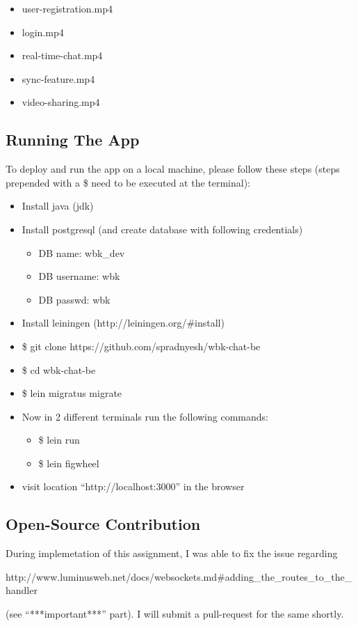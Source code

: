 \documentclass[a4paper, 10pt]{article}
\begin{document}
\begin{itemize}
  \item user-registration.mp4
  \item login.mp4
  \item real-time-chat.mp4
  \item sync-feature.mp4
  \item video-sharing.mp4
\end{itemize}

\subsection{Running The App}
To deploy and run the app on a local machine, please follow these steps (steps prepended with a \$ need to be executed at the terminal):

\begin{itemize}
  \item Install java (jdk)
  \item Install postgresql (and create database with following credentials)
    \begin{itemize}
    \item DB name: wbk\_dev
    \item DB username: wbk
    \item DB passwd: wbk
    \end{itemize}
  \item Install leiningen (http://leiningen.org/\#install)
  \item \$ git clone https://github.com/spradnyesh/wbk-chat-be
  \item \$ cd wbk-chat-be
  \item \$ lein migratus migrate
  \item Now in 2 different terminals run the following commands:
    \begin{itemize}
    \item \$ lein run
    \item \$ lein figwheel
    \end{itemize}
  \item visit location ``http://localhost:3000'' in the browser
\end{itemize}

\subsection{Open-Source Contribution}
During implemetation of this assignment, I was able to fix the issue regarding

http://www.luminusweb.net/docs/websockets.md\#adding\_the\_routes\_to\_the\_handler

(see ``***important***'' part). I will submit a pull-request for the same shortly.

\end{document}
